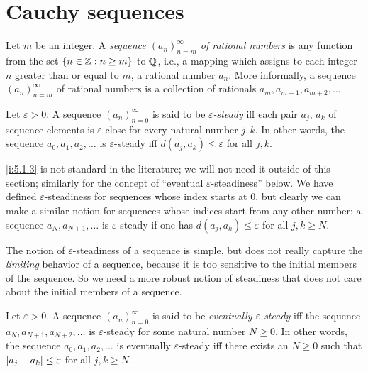 \section{Cauchy sequences}\label{i:sec:5.1}

\begin{defn}[Sequences]\label{i:5.1.1}
  Let \(m\) be an integer.
  A \emph{sequence \((a_n)_{n = m}^{\infty}\) of rational numbers} is any function from the set \(\left\lbrace n \in \mathbb{Z} : n \geq m\right\rbrace\) to \(\mathbb{Q}\), i.e., a mapping which assigns to each integer \(n\) greater than or equal to \(m\), a rational number \(a_n\).
  More informally, a sequence \((a_n)_{n = m}^{\infty}\) of rational numbers is a collection of rationals \(a_m, a_{m + 1}, a_{m + 2}, \dots\).
\end{defn}

\setcounter{thm}{2}
\begin{defn}\label{i:5.1.3}
  Let \(\varepsilon > 0\).
  A sequence \((a_n)_{n = 0}^{\infty}\) is said to be \emph{\(\varepsilon\)-steady} iff each pair \(a_j\), \(a_k\) of sequence elements is \(\varepsilon\)-close for every natural number \(j, k\).
  In other words, the sequence \(a_0, a_1, a_2, \dots\) is \(\varepsilon\)-steady iff \(d(a_j, a_k) \leq \varepsilon\) for all \(j, k\).
\end{defn}

\begin{rmk}\label{i:5.1.4}
  \cref{i:5.1.3} is not standard in the literature;
  we will not need it outside of this section;
  similarly for the concept of ``eventual \(\varepsilon\)-steadiness'' below.
  We have defined \(\varepsilon\)-steadiness for sequences whose index starts at \(0\), but clearly we can make a similar notion for sequences whose indices start from any other number:
  a sequence \(a_N, a_{N + 1}, \dots\) is \(\varepsilon\)-steady if one has \(d(a_j, a_k) \leq \varepsilon\) for all \(j, k \geq N\).
\end{rmk}

\begin{note}
  The notion of \(\varepsilon\)-steadiness of a sequence is simple, but does not really capture the \emph{limiting} behavior of a sequence, because it is too sensitive to the initial members of the sequence.
  So we need a more robust notion of steadiness that does not care about the initial members of a sequence.
\end{note}

\setcounter{thm}{5}
\begin{defn}\label{i:5.1.6}
  Let \(\varepsilon > 0\).
  A sequence \((a_n)_{n = 0}^{\infty}\) is said to be \emph{eventually \(\varepsilon\)-steady} iff the sequence \(a_N, a_{N + 1}, a_{N + 2}, \dots\) is \(\varepsilon\)-steady for some natural number \(N \geq 0\).
  In other words, the sequence \(a_0, a_1, a_2, \dots\) is eventually \(\varepsilon\)-steady iff there exists an \(N \geq 0\) such that \(\left\lvert a_j - a_k\right\rvert \leq \varepsilon\) for all \(j, k \geq N\).
\end{defn}

